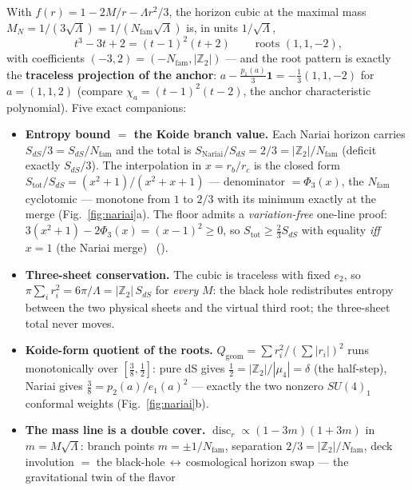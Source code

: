 \documentclass[11pt,a4paper]{article}
\newcommand{\Z}{\mathbb{Z}}
\begin{document}
\TFPTmotif

\begin{keybox}[Nariai $=$ the anchor; the Koide $2/3$ is the entropy bound \mE\ (\veri{v101\_horizon\_anchor.py})]
With $f(r)=1-2M/r-\Lambda r^2/3$, the horizon cubic at the maximal mass
$M_N=1/(3\sqrt\Lambda)=1/(N_{\mathrm{fam}}\sqrt\Lambda)$ is, in units $1/\sqrt\Lambda$,
\[
  \boxed{\ t^3-3t+2=(t-1)^2(t+2)\ }\qquad\text{roots }(1,1,-2),
\]
with coefficients $(-3,2)=(-N_{\mathrm{fam}},|\Z_2|)$ --- and the root pattern is exactly the
\textbf{traceless projection of the anchor}: $a-\tfrac{p_1(a)}{3}\mathbf 1=-\tfrac13(1,1,-2)$ for
$a=(1,1,2)$ (compare $\chi_a=(t-1)^2(t-2)$, the anchor characteristic polynomial). Five exact companions:
\begin{itemize}\setlength\itemsep{2pt}
\item \textbf{Entropy bound $=$ the Koide branch value.} Each Nariai horizon carries $S_{dS}/3=S_{dS}/N_{\mathrm{fam}}$
and the total is $\boxed{S_{\mathrm{Nariai}}/S_{dS}=2/3=|\Z_2|/N_{\mathrm{fam}}}$ (deficit exactly $S_{dS}/3$). The
interpolation in $x=r_b/r_c$ is the closed form
$S_{\mathrm{tot}}/S_{dS}=(x^2{+}1)/(x^2{+}x{+}1)$ --- denominator $=\Phi_3(x)$, the $N_{\mathrm{fam}}$
cyclotomic --- monotone from $1$ to $2/3$ with its minimum exactly at the merge (Fig.~\ref{fig:nariai}a).
The floor admits a \emph{variation-free} one-line proof: $3(x^2{+}1)-2\Phi_3(x)=(x{-}1)^2\ge0$, so
$S_{\mathrm{tot}}\ge\tfrac23 S_{dS}$ with equality \emph{iff} $x=1$ (the Nariai merge) \mE\ ().
\item \textbf{Three-sheet conservation.} The cubic is traceless with fixed $e_2$, so
$\pi\sum_i r_i^2=6\pi/\Lambda=|\Z_2|\,S_{dS}$ for \emph{every} $M$: the black hole redistributes entropy
between the two physical sheets and the virtual third root; the three-sheet total never moves.
\item \textbf{Koide-form quotient of the roots.} $Q_{\mathrm{geom}}=\sum r_i^2/(\sum|r_i|)^2$ runs
monotonically over $[\tfrac38,\tfrac12]$: pure dS gives $\tfrac12=|\Z_2|/|\mu_4|=\delta$ (the half-step),
Nariai gives $\tfrac38=p_2(a)/e_1(a)^2$ --- exactly the two nonzero $SU(4)_1$ conformal weights
(Fig.~\ref{fig:nariai}b).
\item \textbf{The mass line is a double cover.} $\operatorname{disc}_r\propto(1-3m)(1+3m)$ in
$m=M\sqrt\Lambda$: branch points $m=\pm1/N_{\mathrm{fam}}$, separation $2/3=|\Z_2|/N_{\mathrm{fam}}$, deck involution
$=$ the black-hole$\,\leftrightarrow\,$cosmological horizon swap --- the gravitational twin of the flavor

\end{itemize}
\end{keybox}
\end{document}
